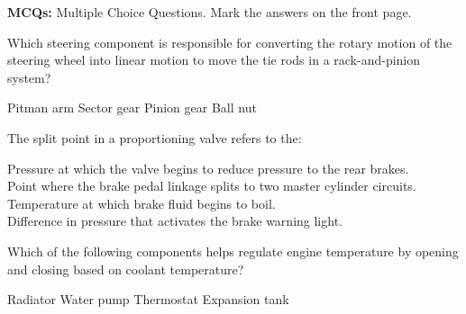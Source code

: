 \documentclass[12pt]{exam}
\begin{document}
			\begin{center} 

            \textbf{MCQs: }Multiple Choice Questions. Mark the answers on the front page. 
            \end{center}

     	\renewcommand*\thechoice{\alph{choice}} 
			\renewcommand*\choicelabel{\thechoice)}
        \setcounter{question}{0}
        \begin{questions}           

                \question Which steering component is responsible for converting the rotary motion of the steering wheel into linear motion to move the tie rods in a rack-and-pinion system? \\ %
                \begin{oneparchoices}
                    \choice Pitman arm
                    \choice Sector gear
                    \choice Pinion gear %
                    \choice Ball nut
                \end{oneparchoices}
 
                \question The split point in a proportioning valve refers to the: \\ %
				\begin{oneparchoices}					
					\choice Pressure at which the valve begins to reduce pressure to the rear brakes. \\%
					\choice Point where the brake pedal linkage splits to two master cylinder circuits.\\
					\choice Temperature at which brake fluid begins to boil. \\
					\choice Difference in pressure that activates the brake warning light.
				\end{oneparchoices}
                
				    \question Which of the following components helps regulate engine temperature by opening and closing based on coolant temperature? \\
                    \begin{oneparchoices}
                        \choice Radiator
                        \choice Water pump
                        \choice Thermostat %
                        \choice Expansion tank
                    \end{oneparchoices}
                    

\end{questions}
\end{document}
